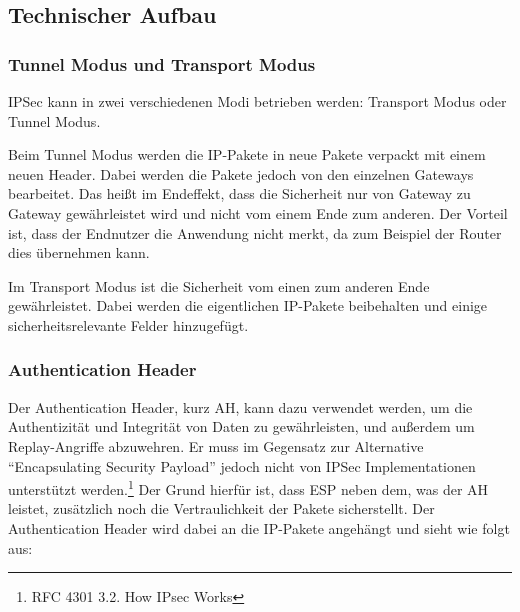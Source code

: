 \documentclass[12pt]{scrartcl}
\begin{document}
\subsection{Technischer Aufbau}
\subsubsection{Tunnel Modus und Transport Modus}
IPSec kann in zwei verschiedenen Modi betrieben werden: Transport Modus oder Tunnel Modus. 

Beim Tunnel Modus werden die IP-Pakete in neue Pakete verpackt mit einem neuen Header. Dabei werden die Pakete jedoch von den einzelnen Gateways bearbeitet. Das heißt im Endeffekt, dass die Sicherheit nur von Gateway zu Gateway gewährleistet wird und nicht vom einem Ende zum anderen. Der Vorteil ist, dass der Endnutzer die Anwendung nicht merkt, da zum Beispiel der Router dies übernehmen kann. 

Im Transport Modus ist die Sicherheit vom einen zum anderen Ende gewährleistet. Dabei werden die eigentlichen IP-Pakete beibehalten und einige sicherheitsrelevante Felder hinzugefügt.

\subsubsection{Authentication Header}
Der Authentication Header, kurz AH, kann dazu verwendet werden, um die Authentizität und Integrität von Daten zu gewährleisten, und außerdem um Replay-Angriffe abzuwehren. Er muss im Gegensatz zur Alternative "`Encapsulating Security Payload"' jedoch nicht von IPSec Implementationen unterstützt werden.\footnote{RFC 4301 3.2.  How IPsec Works} Der Grund hierfür ist, dass ESP neben dem, was der AH leistet, zusätzlich noch die Vertraulichkeit der Pakete sicherstellt. Der Authentication Header wird dabei an die IP-Pakete angehängt und sieht wie folgt aus:

\end{document}
